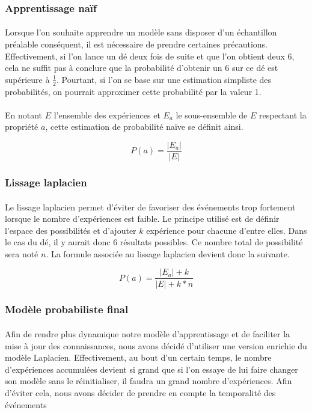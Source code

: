 
\subsubsection{Apprentissage naïf}
\paragraph{}
Lorsque l'on souhaite apprendre un modèle sans disposer d'un échantillon
préalable conséquent, il est nécessaire de prendre certaines précautions.
Effectivement, si l'on lance un dé deux fois de suite et que l'on obtient deux
6, cela ne suffit pas à conclure que la probabilité d'obtenir un 6 sur ce dé
est supérieure à $\frac{1}{2}$. Pourtant, si l'on se base sur une estimation
simpliste des probabilités, on pourrait approximer cette probabilité par la
valeur 1.

\paragraph{}
En notant $E$ l'ensemble des expériences et $E_a$ le sous-ensemble de $E$
respectant la propriété $a$, cette estimation de probabilité naïve se définit
ainsi.

$$P(a) = \frac{|E_a|}{|E|}$$

\subsubsection{Lissage laplacien}
\paragraph{}
Le lissage laplacien permet d'éviter de favoriser des événements trop
fortement lorsque le nombre d'expériences est faible. Le principe utilisé est
de définir l'espace des possibilités et d'ajouter $k$ expérience pour chacune
d'entre elles. Dans le cas du dé, il y aurait donc 6 résultats possibles. Ce
nombre total de possibilité sera noté $n$. La formule associée au lissage
laplacien devient donc la suivante.

$$P(a) = \frac{|E_a| + k}{|E| + k * n} $$

\subsubsection{Modèle probabiliste final}
\paragraph{}
Afin de rendre plus dynamique notre modèle d'apprentissage et de faciliter la
mise à jour des connaissances, nous avons décidé d'utiliser une version
enrichie du modèle Laplacien. Effectivement, au bout d'un certain temps,
le nombre d'expériences accumulées devient si grand que si l'on essaye de lui
faire changer son modèle sans le réinitialiser, il faudra un grand nombre
d'expériences. Afin d'éviter cela, nous avons décider de prendre en compte la
temporalité des événements

